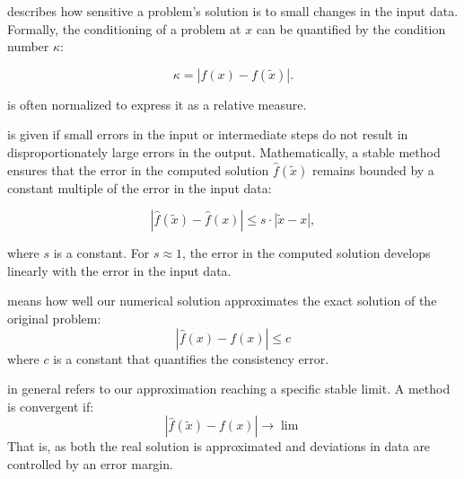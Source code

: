  describes how sensitive a problem's solution is to small changes in the input data. 
Formally, the conditioning of a problem at $x$ can be quantified by the condition number $\kappa$:

\begin{equation}
    \kappa = \left| f(x) - f(\tilde{x}) \right|.
\end{equation}


\newthought{$\kappa$} is often normalized to express it as a relative measure.




 is given if small errors in the input or intermediate steps do not result in disproportionately 
large errors in the output. 
Mathematically, a stable method ensures that the error in the computed solution $\hat{f}(\tilde{x})$ remains bounded by a constant multiple of the error in the input data:

\begin{equation}
    \left| \hat{f}(\tilde{x}) - \hat{f}(x) \right| \leq s \cdot \left| \tilde{x} - x \right|,
\end{equation}

where $s$ is a constant. For $s \approx 1$, the error in the 
computed solution develops linearly with the error in the input data.




 means how well our numerical solution approximates the exact solution of the original problem:
\begin{equation}
    \left| \hat{f}(x) - f(x) \right| \leq c
\end{equation}
where $c$ is a constant that quantifies the consistency error.






 in general refers to our approximation reaching a specific stable limit.
A method is convergent if:
\begin{equation}
   \left| \hat{f}(\tilde{x}) - f(x) \right| \to \lim
\end{equation}
That is, as both the real solution is approximated and deviations in data are controlled by an error margin.











